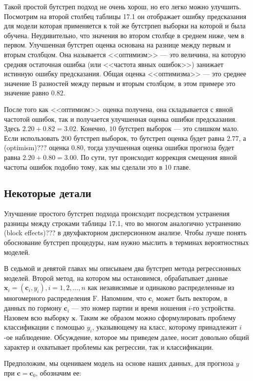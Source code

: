 Такой простой бутстреп подход не очень хорош, но его легко можно улучшить. Посмотрим на второй столбец таблицы 17.1 он отображает ошибку предсказания для модели которая применяется к той же бутстрпеп выборки на которой и была обучена. Неудивительно, что значения во втором столбце в среднем ниже, чем в первом. Улучшенная бутстреп оценка основана на разнице между первым и вторым столбцом. Она называется <<оптимизм>> --- это величина, на которую средняя остаточная ошибка (или <<частота явных ошибок>>) занижает истинную ошибку предсказания. Общая оценка <<оптимизма>> --- это среднее значение B разностей между первым и вторым столбцом, в этом примере это значение равно $0.82$.


После того как <<оптимизм>> оценка получена, она складывается с явной частотой ошибок, так и получается улучшенная оценка ошибки предсказания. Здесь $2.20 + 0.82 = 3.02$. Конечно, $10$ бутстреп выборок --- это слишком мало. Если использовать $200$ бутстреп выборок, то бутстреп оценка будет равна $2.77$, а (optimism)??? оценка $0.80$, тогда улучшенная оценка ошибки прогноза будет равна $2.20 + 0.80 = 3.00$. По сути, тут происходит коррекция смещения явной частоты ошибок подобно тому, как мы сделали это в 10 главе.


\subsection{Некоторые детали}
Улучшение простого бутстреп подхода происходит посредством устранения разницы между строками таблицы 17.1, что во многом аналогично устранению (block effects)??? в двухфакторном дисперсионном анализе. Чтобы лучше понять обоснование бутстреп процедуры, нам нужно мыслить в терминах вероятностных моделей.

В седьмой и девятой главах мы описываем два бутстреп метода регрессионных моделей. Второй метод, на котором мы остановимся, обрабатывает данные $\textbf{x}_{i} = (\textbf{c}_{i}, y_{i}), i = 1, 2,\ldots,n$ как независимые и одинаково распределенные из многомерного распределения $\text{F}$. Напомним, что $\textbf{c}_{i}$ может быть вектором, в данных по гормону $\textbf{c}_{i}$ --- это номер партии и время ношения $i$-го устройства. Назовем всю выборку $\textbf{x}$. Таким же образом можно сформулировать проблему классификации с помощью $y_{i}$, указывющему на класс, которому принадлежит $i$-ое наблюдение. Обсуждение, которое мы приведем далее, носит довольно общий характер и охватывает проблемы как регрессии, так и классификации.

Предположим, мы оцениваем модель на основе наших данных, для прогноза $y$ при $\textbf{c} = \textbf{c}_{0}$, обозначим ее:

